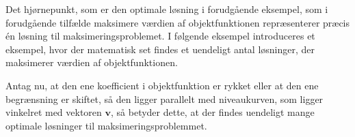 Det hjørnepunkt, som er den optimale løsning i forudgående eksempel, som i forudgående tilfælde maksimere værdien
af objektfunktionen repræsenterer præcis én
løsning til maksimeringsproblemet. I følgende eksempel introduceres et eksempel, hvor der matematisk set findes et uendeligt antal løsninger, der
maksimerer værdien af objektfunktionen.
%

%
Antag nu, at den ene koefficient i objektfunktion er rykket eller at den ene begrænsning er skiftet, så den ligger parallelt med niveaukurven, som ligger vinkelret med vektoren $\textbf{v}$, så betyder dette, at der findes uendeligt mange optimale løsninger til maksimeringsproblemmet. 

